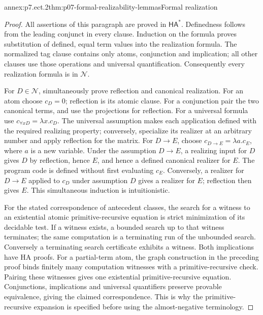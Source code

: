 \begin{annexitem}{annex:p7.ect.2}{thm:p07-formal-realizability-lemmas}{Formal realization}
\begin{proof}
All assertions of this paragraph are proved in
\(\mathsf{HA}^{\ast}\). Definedness follows from the leading
conjunct in every clause. Induction on the formula proves substitution
of defined, equal term values into the realization formula. The
normalized tag clause contains only atoms, conjunction and implication;
all other clauses use those operations and universal quantification.
Consequently every realization formula is in \(\mathcal N\).

For \(D\in\mathcal N\), simultaneously prove reflection and
canonical realization. For an atom choose \(c_D=0\); reflection
is its atomic clause. For a conjunction pair the two canonical
terms, and use the projections for reflection. For a universal
formula use \(c_{\forall xD}=\lambda x.c_D\).
The universal assumption makes each application defined with the
required realizing property; conversely, specialize its realizer
at an arbitrary number and apply reflection for the matrix.
For \(D\to E\), choose \(c_{D\to E}=\lambda a.c_E\),
where \(a\) is a new variable. Under the assumption \(D\to E\),
a realizing input for \(D\) gives \(D\) by reflection, hence
\(E\), and hence a defined canonical realizer for \(E\).
The program code is defined without first evaluating \(c_E\).
Conversely, a realizer for \(D\to E\) applied to \(c_D\)
under assumption \(D\) gives a realizer for \(E\); reflection
then gives \(E\). This simultaneous induction is intuitionistic.

For the stated correspondence of antecedent classes, the search for
a witness to an existential atomic primitive-recursive equation is
strict minimization of its decidable test. If a witness exists, a
bounded search up to that witness terminates; the same computation
is a terminating run of the unbounded search. Conversely a terminating
search certificate exhibits a witness. Both implications have HA
proofs. For a partial-term atom, the graph construction in the
preceding proof binds finitely many computation witnesses with a
primitive-recursive check. Pairing these witnesses gives one
existential primitive-recursive equation. Conjunctions, implications
and universal quantifiers preserve provable equivalence, giving the
claimed correspondence. This is why the primitive-recursive
expansion is specified before using the almost-negative terminology.


\end{proof}
\end{annexitem}
